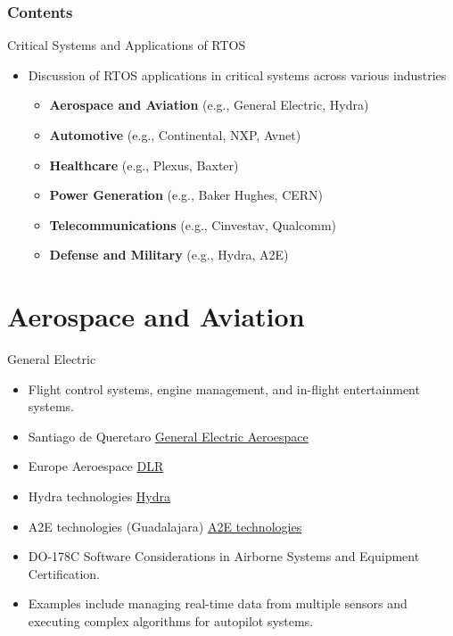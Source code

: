 \documentclass[10pt]{beamer}
\title[Universidad Panamericana]{}
\subtitle{Critical Systems and Applications of RTOS}
\author[]{Name}
\institute[ltonix@up.edu.mx]{Universidad Panamericana}
\date[Presentation \today]
{Presentation \today}
\begin{document}
\frame{\titlepage}
\begin{frame}
\frametitle{Contents}
\tableofcontents
\end{frame}


\begin{frame}{Critical Systems and Applications of RTOS}
    \begin{itemize}
        \item Discussion of RTOS applications in critical systems across various industries
        \begin{itemize}
            \item \textbf{Aerospace and Aviation} (e.g., General Electric, Hydra)
            \item \textbf{Automotive} (e.g., Continental, NXP, Avnet)
            \item \textbf{Healthcare} (e.g., Plexus, Baxter)
            \item \textbf{Power Generation} (e.g., Baker Hughes, CERN)
            \item \textbf{Telecommunications} (e.g., Cinvestav, Qualcomm)
            \item \textbf{Defense and Military} (e.g., Hydra, A2E)
        \end{itemize}
    \end{itemize}
\end{frame}

\section{Aerospace and Aviation}
\begin{frame}{General Electric}
    \begin{itemize}
        \item Flight control systems, engine management, and in-flight entertainment systems.
        \item Santiago de Queretaro \href{https://www.geaerospace.com/commercial}{General Electric Aeroespace}
        \item Europe Aeroespace \href{https://www.dlr.de/en/careers/your-entry/your-specialist-field/research-funding-knowledge-management}{DLR}
        \item Hydra technologies \href{https://www.hydra-technologies.com/}{Hydra}
        \item A2E technologies (Guadalajara) \href{https://www.a2etechnologies.com/}{A2E technologies}
        \item DO-178C Software Considerations in Airborne Systems and Equipment Certification.
        \item Examples include managing real-time data from multiple sensors and executing complex algorithms for autopilot systems.
    \end{itemize}
\end{frame}
\end{document}
